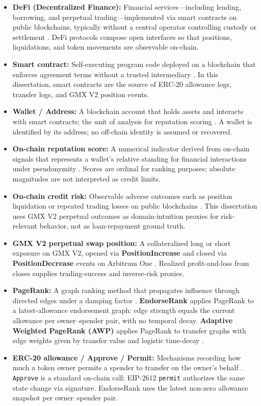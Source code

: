 \begin{itemize}
\item \textbf{DeFi (Decentralized Finance):} Financial services---including lending, borrowing, and perpetual trading---implemented via smart contracts on public blockchains, typically without a central operator controlling custody or settlement . DeFi protocols compose open interfaces so that positions, liquidations, and token movements are observable on-chain.
\item \textbf{Smart contract:} Self-executing program code deployed on a blockchain that enforces agreement terms without a trusted intermediary . In this dissertation, smart contracts are the source of ERC-20 allowance logs, transfer logs, and GMX V2 position events.
\item \textbf{Wallet / Address:} A blockchain account that holds assets and interacts with smart contracts; the unit of analysis for reputation scoring . A wallet is identified by its address; no off-chain identity is assumed or recovered.
\item \textbf{On-chain reputation score:} A numerical indicator derived from on-chain signals that represents a wallet's relative standing for financial interactions under pseudonymity . Scores are ordinal for ranking purposes; absolute magnitudes are not interpreted as credit limits.
\item \textbf{On-chain credit risk:} Observable adverse outcomes such as position liquidation or repeated trading losses on public blockchains . This dissertation uses GMX V2 perpetual outcomes as domain-intuition proxies for risk-relevant behavior, not as loan-repayment ground truth.
\item \textbf{GMX V2 perpetual swap position:} A collateralized long or short exposure on GMX V2, opened via \textbf{PositionIncrease} and closed via \textbf{PositionDecrease} events on Arbitrum One . Realized profit-and-loss from closes supplies trading-success and inverse-risk proxies.
\item \textbf{PageRank:} A graph ranking method that propagates influence through directed edges under a damping factor . \textbf{EndorseRank} applies PageRank to a latest-allowance endorsement graph: edge strength equals the current allowance per owner--spender pair, with no temporal decay. \textbf{Adaptive Weighted PageRank (AWP)} applies PageRank to transfer graphs with edge weights given by transfer value and logistic time-decay .
\item \textbf{ERC-20 allowance / Approve / Permit:} Mechanisms recording how much a token owner permits a spender to transfer on the owner's behalf . \texttt{Approve} is a standard on-chain call; EIP-2612 \texttt{permit} authorizes the same state change via signature. EndorseRank uses the latest non-zero allowance snapshot per owner--spender pair.

\end{itemize}
